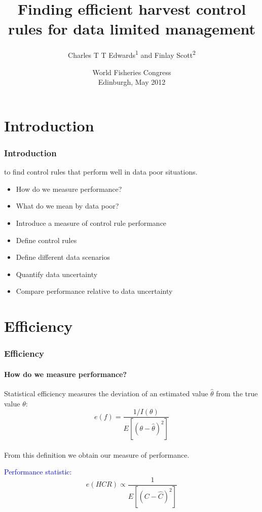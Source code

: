 \documentclass[pdf]{beamer}
\title[Finding efficient HCRs]{
Finding efficient harvest control rules for data limited management
	}
\subtitle{
	}
\author[CE \& FS]{
	Charles T T Edwards\textsuperscript{1} and Finlay Scott\textsuperscript{2}
	}
\institute[ICL and CEFAS]{
	\textsuperscript{1,2}Imperial College London, UK\\\textsuperscript{2}CEFAS, UK
	}
\date[WFC, May 2012]{World Fisheries Congress\\Edinburgh, May 2012}
\begin{document}
\frame{\titlepage}

\section{Introduction}
\begin{frame}
\frametitle{Introduction}
 to find control rules that perform well in data poor situations.
\begin{itemize}
\item How do we measure performance?
\item What do we mean by data poor?
\end{itemize}
\vspace{20pt}
\begin{itemize}
\item Introduce a measure of \alert{control rule performance}
\item Define control rules
\item Define different data scenarios
\item Quantify \alert{data uncertainty}
\item Compare performance relative to data uncertainty
\end{itemize}
\end{frame}

\section{Efficiency}
\begin{frame}
\frametitle{Efficiency}
\framesubtitle{How do we measure performance?}
Statistical efficiency measures the deviation of an estimated value $\hat{\theta}$ from the true value $\theta$:
\begin{equation}
e(f) = \frac{1/I(\theta)}{E[(\theta - \hat{\theta})^2]} \nonumber
\end{equation}
\vspace{20pt}\\
From this definition we obtain our measure of performance.
\begin{block}{}
\textcolor{blue}{Performance statistic:}
\vspace{5pt}
\begin{equation}
e(HCR) \propto \frac{1}{E[(C - \hat{C})^2]} \nonumber
\end{equation}
\vspace{5pt}
\end{block}
\end{frame}
\end{document}
